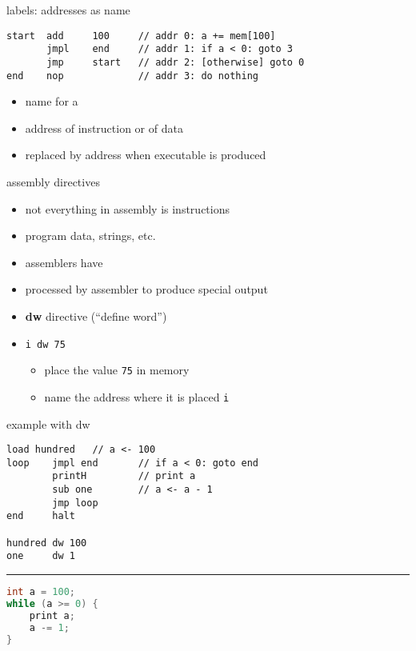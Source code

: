 \begin{frame}[fragile,label=addrAsName2]{labels: addresses as name}
\begin{lstlisting}[language=myasm]
start  add     100     // addr 0: a += mem[100]
       jmpl    end     // addr 1: if a < 0: goto 3
       jmp     start   // addr 2: [otherwise] goto 0
end    nop             // addr 3: do nothing
\end{lstlisting}
    \begin{itemize}
    \item name for a 
    \item address of instruction or of data
    \item replaced by address when executable is produced
    \end{itemize}
\end{frame}


\begin{frame}{assembly directives}
    \begin{itemize}
    \item not everything in assembly is instructions
    \item program data, strings, etc.
    \item assemblers have 
    \item processed by assembler to produce special output
    \vspace{.5cm}
    \item<2-> \textbf{dw} directive (``define word'')
    \item<3-> \texttt{i dw 75}
        \begin{itemize}
            \item place the value \texttt{75} in memory
            \item name the address where it is placed \texttt{i}
        \end{itemize}
    \end{itemize}
\end{frame}

\begin{frame}[fragile,label=dwExample]{example with dw}
\begin{lstlisting}[language=myasm,style=small]
        load hundred   // a <- 100
loop    jmpl end       // if a < 0: goto end
        printH         // print a
        sub one        // a <- a - 1
        jmp loop
end     halt

hundred dw 100
one     dw 1
\end{lstlisting}
\hrule
\begin{lstlisting}[language=C++,style=small]
int a = 100;
while (a >= 0) {
    print a;
    a -= 1;
}
\end{lstlisting}
\end{frame}

